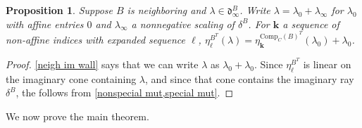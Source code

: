 \documentclass{amsart}
\newtheorem{proposition}{Proposition}[section]
\theoremstyle{definition}
\theoremstyle{remark}
\numberwithin{equation}{section}
\newcommand{\0}{{\mathbf{0}}}
\newcommand{\Comp}{\mathrm{Comp}_C}
\newcommand{\kk}{\mathbf{k}}
\renewcommand{\ll}{{\boldsymbol\ell}}
\renewcommand{\d}{{\mathfrak d}}
\begin{document}
\begin{proposition}\label{factor eta}
Suppose $B$ is neighboring and $\lambda\in\d_\infty^B$.
Write $\lambda=\lambda_0+\lambda_\infty$ for $\lambda_0$ with affine entries $0$ and $\lambda_\infty$ a nonnegative scaling of $\delta^B$.
For $\kk$ a sequence of non-affine indices with expanded sequence $\ll$, ${\eta^{B^T}_\ll(\lambda)=\eta_\kk^{\Comp(B)^T}(\lambda_0)+\lambda_0}$.
\end{proposition}
\begin{proof}
\cref{neigh im wall} says that we can write $\lambda$ as $\lambda_0+\lambda_0$.
Since $\eta_\ll^{B^T}$ is linear on the imaginary cone containing $\lambda$, and since that cone contains the imaginary ray~$\delta^B$, the  follows from \cref{nonspecial mut,special mut}.
\end{proof}


We now prove the main theorem.
\end{document}
